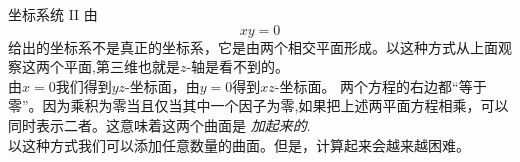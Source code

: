 ﻿\begin{surferPage}{坐标系统 II}
由\[xy=0\]给出的坐标系不是真正的坐标系，它是由两个相交平面形成。以这种方式从上面观察这两个平面,第三维也就是$z$-轴是看不到的。
\\
\vspace{0.3cm}
由$x=0$我们得到$yz$-坐标面，由$y=0$得到$xz$-坐标面。
两个方程的右边都“等于零”。因为乘积为零当且仅当其中一个因子为零,如果把上述两平面方程相乘，可以同时表示二者。这意味着这两个曲面是\textit{ 加起来的}. \\
以这种方式我们可以添加任意数量的曲面。但是，计算起来会越来越困难。
\end{surferPage}
